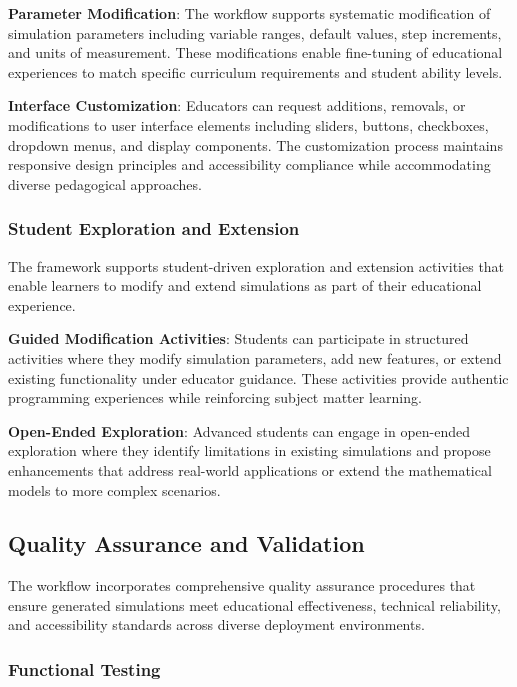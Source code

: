 \textbf{Parameter Modification}: The workflow supports systematic modification of simulation parameters including variable ranges, default values, step increments, and units of measurement. These modifications enable fine-tuning of educational experiences to match specific curriculum requirements and student ability levels.

\textbf{Interface Customization}: Educators can request additions, removals, or modifications to user interface elements including sliders, buttons, checkboxes, dropdown menus, and display components. The customization process maintains responsive design principles and accessibility compliance while accommodating diverse pedagogical approaches.

\subsubsection{Student Exploration and Extension}

The framework supports student-driven exploration and extension activities that enable learners to modify and extend simulations as part of their educational experience.

\textbf{Guided Modification Activities}: Students can participate in structured activities where they modify simulation parameters, add new features, or extend existing functionality under educator guidance. These activities provide authentic programming experiences while reinforcing subject matter learning.

\textbf{Open-Ended Exploration}: Advanced students can engage in open-ended exploration where they identify limitations in existing simulations and propose enhancements that address real-world applications or extend the mathematical models to more complex scenarios.

\subsection{Quality Assurance and Validation}

The workflow incorporates comprehensive quality assurance procedures that ensure generated simulations meet educational effectiveness, technical reliability, and accessibility standards across diverse deployment environments.

\subsubsection{Functional Testing}

